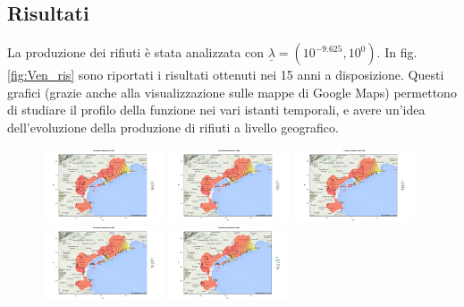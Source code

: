 \documentclass[a4paper,11pt,twoside,openright]{book}							%
\begin{document}
\subsection{Risultati}
La produzione dei rifiuti è stata analizzata con $\underline \lambda = (10^{-9.625}, 10^{0})$. In fig. \ref{fig:Ven_ris} sono riportati i risultati ottenuti nei 15 anni a disposizione. Questi grafici (grazie anche alla visualizzazione sulle mappe di Google Maps) permettono di studiare il profilo della funzione nei vari istanti temporali, e avere un'idea dell'evoluzione della produzione di rifiuti a livello geografico.

\begin{figure}[H]
\centering
\includegraphics[trim=0cm 0cm 4cm 0cm,clip=true,width=0.32\textwidth]{Immagini/venezia_senza_covariate/Maps1997.png}
\includegraphics[trim=0cm 0cm 4cm 0cm,clip=true,width=0.32\textwidth]{Immagini/venezia_senza_covariate/Maps1998.png}
\includegraphics[trim=0cm 0cm 4cm 0cm,clip=true,width=0.32\textwidth]{Immagini/venezia_senza_covariate/Maps1999.png}
\includegraphics[trim=0cm 0cm 4cm 0cm,clip=true,width=0.32\textwidth]{Immagini/venezia_senza_covariate/Maps2000.png}
\includegraphics[trim=0cm 0cm 4cm 0cm,clip=true,width=0.32\textwidth]{Immagini/venezia_senza_covariate/Maps2001.png}

\end{figure}
\end{document}
